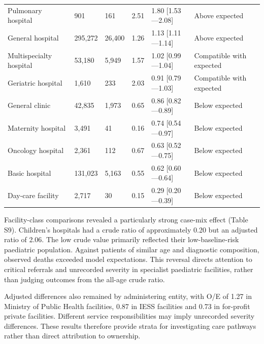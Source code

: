 \documentclass[11pt,a4paper]{article}
\begin{document}
\begin{longtable}{@{}L{49.23mm}L{21.91mm}L{21.91mm}L{21.91mm}L{21.91mm}L{21.91mm}@{}}
Pulmonary hospital & 901 & 161 & 2.51 & 1.80 [1.53—2.08] & Above expected \\
General hospital & 295,272 & 26,400 & 1.26 & 1.13 [1.11—1.14] & Above expected \\
Multispecialty hospital & 53,180 & 5,949 & 1.57 & 1.02 [0.99—1.04] & Compatible with expected \\
Geriatric hospital & 1,610 & 233 & 2.03 & 0.91 [0.79—1.03] & Compatible with expected \\
General clinic & 42,835 & 1,973 & 0.65 & 0.86 [0.82—0.89] & Below expected \\
Maternity hospital & 3,491 & 41 & 0.16 & 0.74 [0.54—0.97] & Below expected \\
Oncology hospital & 2,361 & 112 & 0.67 & 0.63 [0.52—0.75] & Below expected \\
Basic hospital & 131,023 & 5,163 & 0.55 & 0.62 [0.60—0.64] & Below expected \\
Day-care facility & 2,717 & 30 & 0.15 & 0.29 [0.20—0.39] & Below expected \\
\end{longtable}\endgroup
Facility-class comparisons revealed a particularly strong case-mix effect (Table S9). Children’s hospitals had a crude ratio of approximately 0.20 but an adjusted ratio of 2.06. The low crude value primarily reflected their low-baseline-risk paediatric population. Against patients of similar age and diagnostic composition, observed deaths exceeded model expectations. This reversal directs attention to critical referrals and unrecorded severity in specialist paediatric facilities, rather than judging outcomes from the all-age crude ratio.

Adjusted differences also remained by administering entity, with O/E of 1.27 in Ministry of Public Health facilities, 0.87 in IESS facilities and 0.73 in for-profit private facilities. Different service responsibilities may imply unrecorded severity differences. These results therefore provide strata for investigating care pathways rather than direct attribution to ownership.
\end{document}
